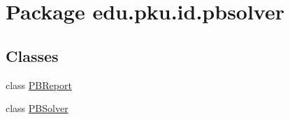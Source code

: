 \hypertarget{namespaceedu_1_1pku_1_1id_1_1pbsolver}{
\section{Package edu.pku.id.pbsolver}
\label{namespaceedu_1_1pku_1_1id_1_1pbsolver}
}
\subsection*{Classes}
\begin{DoxyCompactItemize}
\item 
class \hyperlink{classedu_1_1pku_1_1id_1_1pbsolver_1_1_p_b_report}{PBReport}
\item 
class \hyperlink{classedu_1_1pku_1_1id_1_1pbsolver_1_1_p_b_solver}{PBSolver}
\end{DoxyCompactItemize}
